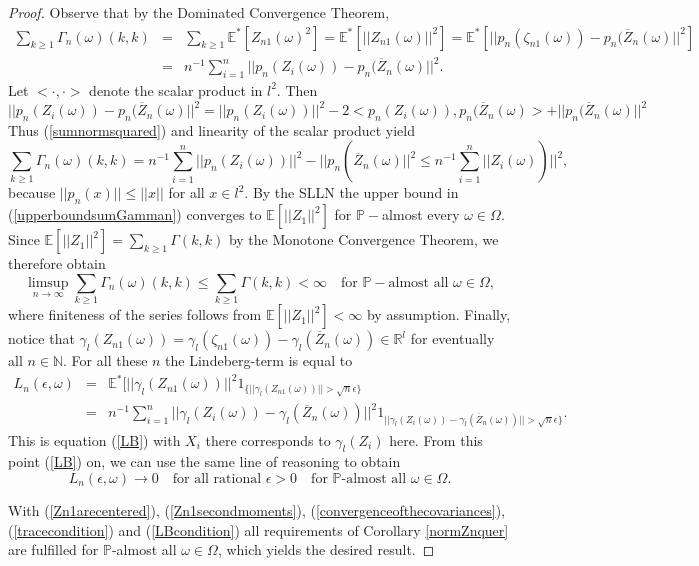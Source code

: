 \documentclass[10pt,a4paper]{amsart}
\begin{document}
\begin{proof}
Observe that by the Dominated Convergence Theorem,
\begin{eqnarray}
 \sum_{k \ge 1}\Gamma_n(\omega)(k,k)&=& \sum_{k \ge 1}\mathbb{E}^*[Z_{n1}(\omega)^2]= \mathbb{E}^*[||Z_{n1}(\omega)||^2]=\mathbb{E}^*[||p_n(\zeta_{n1}(\omega))-p_n(\overline{Z}_n(\omega)||^2] \nonumber\\
 &=& n^{-1}\sum_{i=1}^n ||p_n(Z_i(\omega))-p_n(\overline{Z}_n(\omega)||^2. \label{sumnormsquared}
\end{eqnarray}
Let $<\cdot,\cdot>$ denote the scalar product in $l^2$. Then
$$
||p_n(Z_i(\omega))-p_n(\overline{Z}_n(\omega)||^2 = ||p_n(Z_i(\omega))||^2 - 2<p_n(Z_i(\omega)),p_n(\overline{Z}_n(\omega)>+||p_n(\overline{Z}_n(\omega)||^2
$$
Thus (\ref{sumnormsquared}) and linearity of the scalar product yield
\begin{equation} \label{upperboundsumGamman}
 \sum_{k \ge 1}\Gamma_n(\omega)(k,k)= n^{-1}\sum_{i=1}^n ||p_n(Z_i(\omega))||^2-||p_n(\overline{Z}_n(\omega)||^2 \le  n^{-1}\sum_{i=1}^n ||Z_i(\omega))||^2,
\end{equation}
because $||p_n(x)|| \le ||x||$ for all $x \in l^2.$ By the SLLN the upper bound in (\ref{upperboundsumGamman}) converges to $\mathbb{E}[||Z_1||^2]$ for $\mathbb{P}-$almost every $\omega \in \Omega$. Since $\mathbb{E}[||Z_1||^2]=\sum_{k \ge 1}\Gamma(k,k)$ by the Monotone Convergence Theorem, we therefore obtain
\begin{equation} \label{tracecondition}
 \limsup_{n \rightarrow \infty}\sum_{k \ge 1}\Gamma_n(\omega)(k,k) \le \sum_{k \ge 1}\Gamma(k,k)<\infty \quad \text{for }\mathbb{P-}\text{almost all } \omega \in \Omega,
\end{equation}
where finiteness of the series follows from $\mathbb{E}[||Z_1||^2]< \infty$ by assumption. Finally, notice that
$\gamma_l(Z_{n1}(\omega))= \gamma_l(\zeta_{n1}(\omega))-\gamma_l(\overline{Z}_n(\omega)) \in \mathbb{R}^l$ for eventually all $n \in \mathbb{N}$.
For all these $n$ the Lindeberg-term is equal to
\begin{eqnarray*}
 L_n(\epsilon,\omega)&=&\mathbb{E}^*[||\gamma_l(Z_{n1}(\omega))||^2 1_{\{||\gamma_l(Z_{n1}(\omega))||> \sqrt{n} \epsilon\}}\\
  &=& n^{-1}\sum_{i=1}^n ||\gamma_l(Z_i(\omega))-\gamma_l(\overline{Z}_n(\omega))||^2 1_{||\gamma_l(Z_i(\omega))-\gamma_l(\overline{Z}_n(\omega))||>\sqrt{n} \epsilon\}}.
\end{eqnarray*}
This is equation (\ref{LB}) with $X_i$ there corresponds to $\gamma_l(Z_i)$ here. From this point (\ref{LB}) on, we can use the same line of reasoning to obtain
\begin{equation} \label{LBcondition}
 L_n(\epsilon,\omega) \rightarrow 0 \quad \text{for all rational } \epsilon >0 \quad \text{for }\mathbb{P}\text{-almost all } \omega \in \Omega.
\end{equation}

With (\ref{Zn1arecentered}), (\ref{Zn1secondmoments}), (\ref{convergenceofthecovariances}), (\ref{tracecondition}) and (\ref{LBcondition})
all requirements of Corollary \ref{normZnquer} are fulfilled for $\mathbb{P}$-almost all $\omega \in \Omega$, which yields the desired result.
\end{proof}
\end{document}
